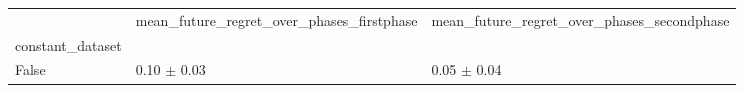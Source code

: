 \begin{tabular}{lll}
\toprule
 & mean_future_regret_over_phases_firstphase & mean_future_regret_over_phases_secondphase \\
constant_dataset &  &  \\
\midrule
False & 0.10 $\pm$ 0.03 & 0.05 $\pm$ 0.04 \\
\bottomrule
\end{tabular}
